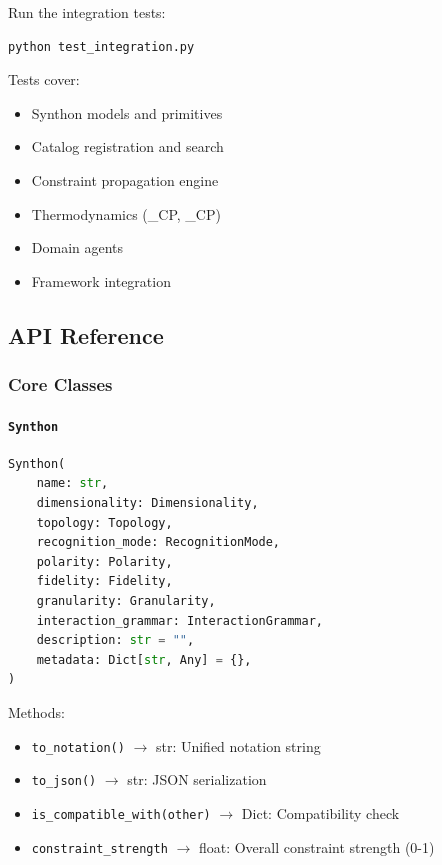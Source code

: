\documentclass[12pt,a4paper]{article}
\begin{document}
Run the integration tests:

\begin{lstlisting}[language=bash]
python test_integration.py
\end{lstlisting}

Tests cover:

\begin{itemize}
    \item Synthon models and primitives
    \item Catalog registration and search
    \item Constraint propagation engine
    \item Thermodynamics (\eta\_CP, \xi\_CP)
    \item Domain agents
    \item Framework integration
\end{itemize}

\subsection{API Reference}

\subsubsection{Core Classes}

\paragraph{\texttt{Synthon}}

\begin{lstlisting}[language=Python]
Synthon(
    name: str,
    dimensionality: Dimensionality,
    topology: Topology,
    recognition_mode: RecognitionMode,
    polarity: Polarity,
    fidelity: Fidelity,
    granularity: Granularity,
    interaction_grammar: InteractionGrammar,
    description: str = "",
    metadata: Dict[str, Any] = {},
)
\end{lstlisting}

Methods:

\begin{itemize}
    \item \texttt{to\_notation()} $\rightarrow$ str: Unified notation string
    \item \texttt{to\_json()} $\rightarrow$ str: JSON serialization
    \item \texttt{is\_compatible\_with(other)} $\rightarrow$ Dict: Compatibility check
    \item \texttt{constraint\_strength} $\rightarrow$ float: Overall constraint strength (0-1)
\end{itemize}
\end{document}
